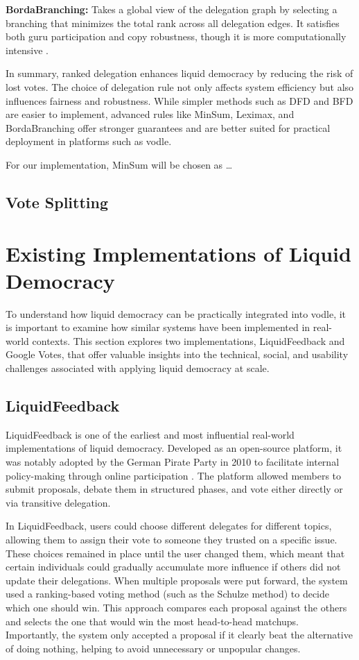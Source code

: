 \textbf{BordaBranching:} Takes a global view of the delegation graph by selecting a branching that minimizes the total rank across all delegation edges. It satisfies both guru participation and copy robustness, though it is more computationally intensive \citep{brill_liquid_2022}.

In summary, ranked delegation enhances liquid democracy by reducing the risk of lost votes. The choice of delegation rule not only affects system efficiency but also influences fairness and robustness. While simpler methods such as DFD and BFD are easier to implement, advanced rules like MinSum, Leximax, and BordaBranching offer stronger guarantees and are better suited for practical deployment in platforms such as vodle.

For our implementation, MinSum will be chosen as \dots

\subsection*{Vote Splitting}



\section{Existing Implementations of Liquid Democracy}
To understand how liquid democracy can be practically integrated into vodle, it is important to examine how similar systems have been implemented in real-world contexts. 
This section explores two implementations, LiquidFeedback and Google Votes, that offer valuable insights into the technical, social, and usability challenges associated with applying liquid democracy at scale.
\subsection{LiquidFeedback}
LiquidFeedback is one of the earliest and most influential real-world implementations of liquid democracy. Developed as an open-source platform, it was notably adopted by the German Pirate Party in 2010 to facilitate internal policy-making through online participation \citep{behrens_liquidfeedback_2014}. The platform allowed members to submit proposals, debate them in structured phases, and vote either directly or via transitive delegation.

In LiquidFeedback, users could choose different delegates for different topics, allowing them to assign their vote to someone they trusted on a specific issue. These choices remained in place until the user changed them, which meant that certain individuals could gradually accumulate more influence if others did not update their delegations. When multiple proposals were put forward, the system used a ranking-based voting method (such as the Schulze method) to decide which one should win. This approach compares each proposal against the others and selects the one that would win the most head-to-head matchups. Importantly, the system only accepted a proposal if it clearly beat the alternative of doing nothing, helping to avoid unnecessary or unpopular changes.

